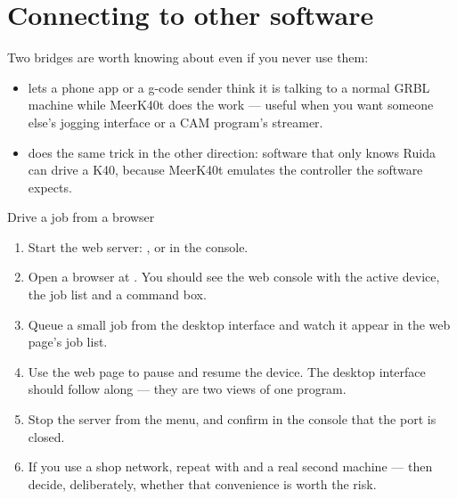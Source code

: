 \section{Connecting to other software}

Two bridges are worth knowing about even if you never use them:

\begin{itemize}
  \item {} lets a phone app or a g-code sender think it is talking
        to a normal GRBL machine while MeerK40t does the work --- useful when you
        want someone else's jogging interface or a CAM program's streamer.
  \item {} does the same trick in the other direction: software
        that only knows Ruida can drive a K40, because MeerK40t emulates the
        controller the software expects.
\end{itemize}

\begin{tryit}{Drive a job from a browser}
\begin{enumerate}[label=\arabic*.,leftmargin=1.4em]
  \item Start the web server: , or
         in the console.
  \item Open a browser at . You should see the web
        console with the active device, the job list and a command box.
  \item Queue a small job from the desktop interface and watch it appear in the
        web page's job list.
  \item Use the web page to pause and resume the device. The desktop interface
        should follow along --- they are two views of one program.
  \item Stop the server from the  menu, and confirm in the console
        that the port is closed.
  \item If you use a shop network, repeat with  and a real
        second machine --- then decide, deliberately, whether that convenience is
        worth the risk.
\end{enumerate}
\end{tryit}
